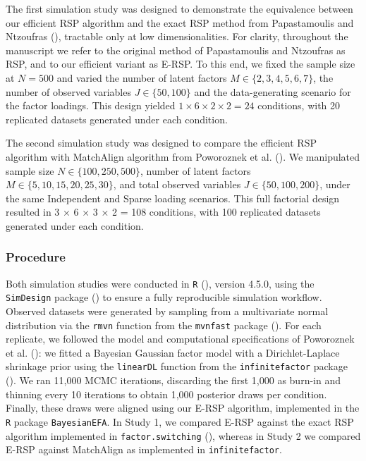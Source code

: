 \documentclass[
  man,
  longtable,
  nolmodern,
  notxfonts,
  notimes,
  colorlinks=true,linkcolor=blue,citecolor=blue,urlcolor=blue]{apa7}
\theoremstyle{plain}
\theoremstyle{plain}
\theoremstyle{remark}
\begin{document}
The first simulation study was designed to demonstrate the equivalence
between our efficient RSP algorithm and the exact RSP method from
Papastamoulis and Ntzoufras
(), tractable only
at low dimensionalities. For clarity, throughout the manuscript we refer
to the original method of Papastamoulis and Ntzoufras as RSP, and to our
efficient variant as E-RSP. To this end, we fixed the sample size at
\(N=500\) and varied the number of latent factors
\(M\in\{2,3,4,5,6,7\}\), the number of observed variables
\(J\in\{50,100\}\) and the data-generating scenario for the factor
loadings. This design yielded \(1 \times 6 \times 2 \times 2 = 24\)
conditions, with 20 replicated datasets generated under each condition.

The second simulation study was designed to compare the efficient RSP
algorithm with MatchAlign algorithm from Poworoznek et al.
(). We manipulated sample size
\(N \in \{100, 250, 500\}\), number of latent factors
\(M \in \{5, 10, 15, 20, 25, 30\}\), and total observed variables
\(J \in \{50, 100, 200\}\), under the same Independent and Sparse
loading scenarios. This full factorial design resulted in 3 × 6 × 3 × 2
= 108 conditions, with 100 replicated datasets generated under each
condition.

\subsubsection{Procedure}\label{procedure}

Both simulation studies were conducted in \texttt{R}
(), version 4.5.0, using the
\texttt{SimDesign} package () to ensure a fully reproducible simulation workflow. Observed
datasets were generated by sampling from a multivariate normal
distribution via the \texttt{rmvn} function from the \texttt{mvnfast}
package (). For each replicate, we
followed the model and computational specifications of Poworoznek et al.
(): we fitted a Bayesian Gaussian
factor model with a Dirichlet-Laplace shrinkage prior using the
\texttt{linearDL} function from the \texttt{infinitefactor} package
(). We ran 11,000 MCMC
iterations, discarding the first 1,000 as burn-in and thinning every 10
iterations to obtain 1,000 posterior draws per condition. Finally, these
draws were aligned using our E-RSP algorithm, implemented in the
\texttt{R} package \texttt{BayesianEFA}. In Study 1, we compared E-RSP
against the exact RSP algorithm implemented in \texttt{factor.switching}
(), whereas in Study 2 we compared E-RSP against
MatchAlign as implemented in \texttt{infinitefactor}.
\end{document}
